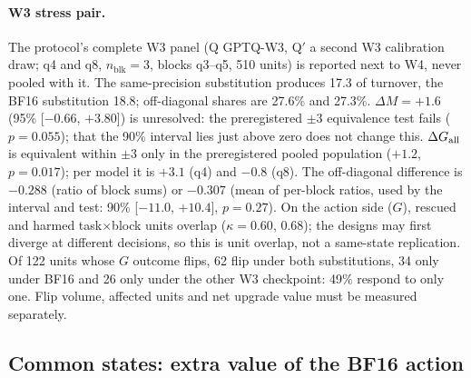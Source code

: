 \paragraph{W3 stress pair.} The protocol's complete W3 panel (Q GPTQ-W3, Q$'$ a second W3 calibration draw; q4 and q8, $n_{\mathrm{blk}}=3$, blocks q3--q5, 510 units) is reported next to W4, never pooled with it. The same-precision substitution produces 17.3\pp{} of turnover, the BF16 substitution 18.8\pp{}; off-diagonal shares are 27.6\% and 27.3\%. %
$\Delta M=+1.6$\pp{} (95\% [$-0.66$, $+3.80$]) is unresolved: the preregistered $\pm$3\pp{} equivalence test fails ($p=0.055$); that the 90\% interval lies just above zero does not change this. $\Delta G_{\mathrm{all}}$ is equivalent within $\pm$3\pp{} only in the preregistered pooled population ($+1.2$, $p=0.017$); per model it is $+3.1$ (q4) and $-0.8$\pp{} (q8). The off-diagonal difference is $-0.288$ (ratio of block sums) or $-0.307$ (mean of per-block ratios, used by the interval and test: 90\% [$-11.0$, $+10.4]$, $p=0.27$). %
On the action side ($G$), rescued and harmed task$\times$block units overlap ($\kappa=0.60$, $0.68$); the designs may first diverge at different decisions, so this is unit overlap, not a same-state replication. Of 122 units whose $G$ outcome flips, 62 flip under both substitutions, 34 only under BF16 and 26 only under the other W3 checkpoint: 49\% respond to only one. Flip volume, affected units and net upgrade value must be measured separately. %

\subsection{Common states: extra value of the BF16 action}
\label{app:commonstate}
